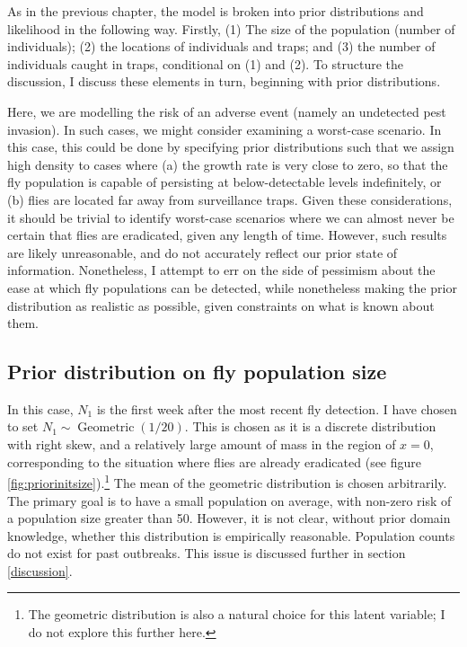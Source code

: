 \documentclass[
  oneside]{book}
\begin{document}
As in the previous chapter, the model is broken into prior distributions and likelihood in the following way. Firstly, (1) The size of the population (number of individuals); (2) the locations of individuals and traps; and (3) the number of individuals caught in traps, conditional on (1) and (2). To structure the discussion, I discuss these elements in turn, beginning with prior distributions.

Here, we are modelling the risk of an adverse event (namely an undetected pest invasion). In such cases, we might consider examining a worst-case scenario. In this case, this could be done by specifying prior distributions such that we assign high density to cases where (a) the growth rate is very close to zero, so that the fly population is capable of persisting at below-detectable levels indefinitely, or (b) flies are located far away from surveillance traps. Given these considerations, it should be trivial to identify worst-case scenarios where we can almost never be certain that flies are eradicated, given any length of time. However, such results are likely unreasonable, and do not accurately reflect our prior state of information. Nonetheless, I attempt to err on the side of pessimism about the ease at which fly populations can be detected, while nonetheless making the prior distribution as realistic as possible, given constraints on what is known about them.

\hypertarget{popn-size}{%
\subsection{Prior distribution on fly population size}\label{popn-size}}

In this case, \(N_1\) is the first week after the most recent fly detection. I have chosen to set \(N_1 \sim \operatorname{Geometric}(1/20)\). This is chosen as it is a discrete distribution with right skew, and a relatively large amount of mass in the region of \(x = 0\), corresponding to the situation where flies are already eradicated (see figure \ref{fig:priorinitsize}).\footnote{The geometric distribution is also a natural choice for this latent variable; I do not explore this further here.} The mean of the geometric distribution is chosen arbitrarily. The primary goal is to have a small population on average, with non-zero risk of a population size greater than 50. However, it is not clear, without prior domain knowledge, whether this distribution is empirically reasonable. Population counts do not exist for past outbreaks. This issue is discussed further in section \ref{discussion}.
\end{document}
